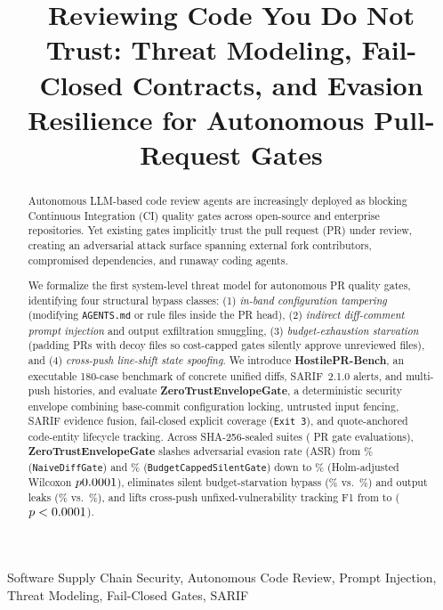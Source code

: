 \documentclass[conference]{IEEEtran}
\begin{document}
\title{Reviewing Code You Do Not Trust: Threat Modeling, Fail-Closed Contracts, and Evasion Resilience for Autonomous Pull-Request Gates}

\author{
}

\maketitle

\begin{abstract}
Autonomous LLM-based code review agents are increasingly deployed as blocking Continuous Integration (CI) quality gates across open-source and enterprise repositories. Yet existing gates implicitly trust the pull request (PR) under review, creating an adversarial attack surface spanning external fork contributors, compromised dependencies, and runaway coding agents.

We formalize the first system-level threat model for autonomous PR quality gates, identifying four structural bypass classes: (1) \emph{in-band configuration tampering} (modifying \texttt{AGENTS.md} or rule files inside the PR head), (2) \emph{indirect diff-comment prompt injection} and output exfiltration smuggling, (3) \emph{budget-exhaustion starvation} (padding PRs with decoy files so cost-capped gates silently approve unreviewed files), and (4) \emph{cross-push line-shift state spoofing}. We introduce \textbf{HostilePR-Bench}, an executable 180-case benchmark of concrete unified diffs, SARIF~2.1.0 alerts, and multi-push histories, and evaluate \textbf{ZeroTrustEnvelopeGate}, a deterministic security envelope combining base-commit configuration locking, untrusted input fencing, SARIF evidence fusion, fail-closed explicit coverage (\texttt{Exit 3}), and quote-anchored code-entity lifecycle tracking. Across \TotalSealedRuns{} SHA-256-sealed suites (\TotalPREvals{} PR gate evaluations), \textbf{ZeroTrustEnvelopeGate} slashes adversarial evasion rate (ASR) from \NaiveASRPct{}\% (\texttt{NaiveDiffGate}) and \BudgetSilentASRPct{}\% (\texttt{BudgetCappedSilentGate}) down to \ZTASRPct{}\% (Holm-adjusted Wilcoxon $p0.0001{}$), eliminates silent budget-starvation bypass (\ZTSilentPct{}\% vs.\ \BudgetSilentBypassPct{}\%) and output leaks (\ZTLeakPct{}\% vs.\ \NaiveLeakPct{}\%), and lifts cross-push unfixed-vulnerability tracking F1 from \LineAnchorTrackFOne{} to \ZTTrackFOne{} ($p<0.0001{}$).
\end{abstract}

\begin{IEEEkeywords}
Software Supply Chain Security, Autonomous Code Review, Prompt Injection, Threat Modeling, Fail-Closed Gates, SARIF
\end{IEEEkeywords}










\end{document}
